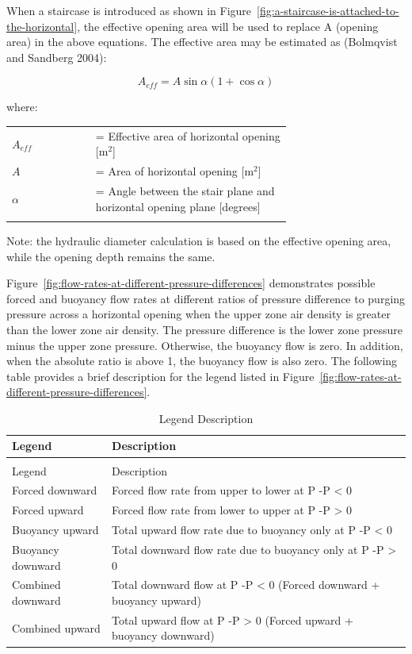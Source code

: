 When a staircase is introduced as shown in Figure~\ref{fig:a-staircase-is-attached-to-the-horizontal}, the effective opening area will be used to replace A (opening area) in the above equations. The effective area may be estimated as (Bolmqvist and Sandberg 2004):

\begin{equation}
A_{eff} = A\sin \alpha (1 + \cos \alpha )
\end{equation}

where:

\begin{tabular}{lp{0.7\linewidth}}
\\
$A_{eff}$ &= Effective area of horizontal opening [m\(^{2}\)]\\
$A$ &= Area of horizontal opening [m\(^{2}\)] \\
$\alpha$ &= Angle between the stair plane and horizontal opening plane [degrees]\\
\\
\end{tabular}

Note: the hydraulic diameter calculation is based on the effective opening area, while the opening depth remains the same.

Figure~\ref{fig:flow-rates-at-different-pressure-differences} demonstrates possible forced and buoyancy flow rates at different ratios of pressure difference to purging pressure across a horizontal opening when the upper zone air density is greater than the lower zone air density. The pressure difference is the lower zone pressure minus the upper zone pressure. Otherwise, the buoyancy flow is zero. In addition, when the absolute ratio is above 1, the buoyancy flow is also zero. The following table provides a brief description for the legend listed in Figure~\ref{fig:flow-rates-at-different-pressure-differences}.

\begin{longtable}[c]{p{1.5in}p{4.5in}}
\caption{Legend Description \label{table:legend-description}} \tabularnewline
\toprule 
Legend & Description \tabularnewline
\midrule
\endfirsthead

\caption[]{Legend Description} \tabularnewline
\toprule 
Legend & Description \tabularnewline
\midrule
\endhead

Forced downward & Forced flow rate from upper to lower at P  -P    <  0 \tabularnewline
Forced upward & Forced flow rate from lower to upper at P  -P    >  0 \tabularnewline
Buoyancy upward & Total upward flow rate due to buoyancy only at P  -P    <  0 \tabularnewline
Buoyancy downward & Total downward flow rate due to buoyancy only at P  -P    >  0 \tabularnewline
Combined downward & Total downward flow at P  -P    <  0 (Forced downward + buoyancy upward) \tabularnewline
Combined upward & Total upward flow at P  -P    >  0 (Forced upward + buoyancy downward) \tabularnewline
\bottomrule
\end{longtable}

